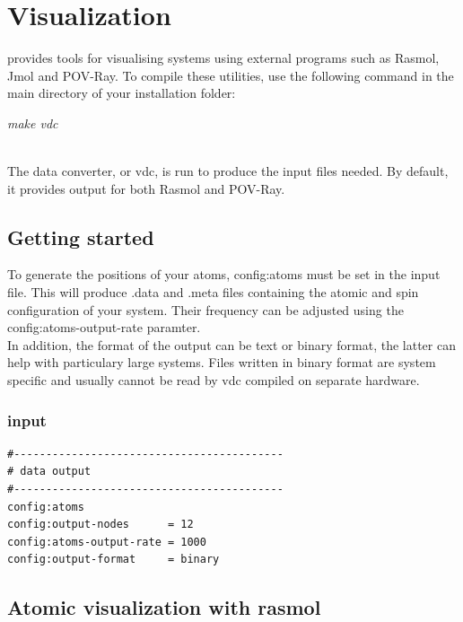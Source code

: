 \chapter{Visualization}\label{chap:visualization}

\vampire provides tools for visualising systems using external programs such as Rasmol, Jmol and POV-Ray. To compile these utilities, use the following command in the main directory of your \vampire installation folder:

\begin{minipage}[c]{\textwidth}
\centering
\textit{make vdc}
\end{minipage}\\

 The \vampire data converter, or vdc, is run to produce the input files needed. By default, it provides output for both Rasmol and POV-Ray.


\section*{Getting started}
To generate the positions of your atoms, config:atoms must be set in the input file. This will produce .data and .meta files containing the atomic and spin configuration of your system. Their frequency can be adjusted using the config:atoms-output-rate paramter.\\

In addition, the format of the output can be text or binary format, the latter can help with particulary large systems. Files written in binary format are system specific and usually cannot be read by vdc compiled on separate hardware.\\

\subsection*{input}
{\footnotesize
\begin{verbatim}
#------------------------------------------
# data output
#------------------------------------------
config:atoms
config:output-nodes      = 12
config:atoms-output-rate = 1000
config:output-format     = binary
\end{verbatim}
}

\section*{Atomic visualization with rasmol}

